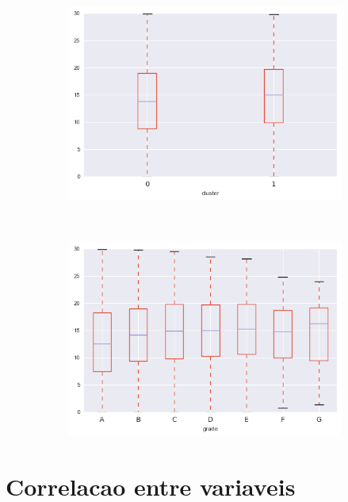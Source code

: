 \begin{anexosenv}
\begin{figure}[t!]
\begin{subfigure}[t]{0.5\textwidth}
            \centerline{\includegraphics[width=1.05\textwidth]{img/dti_by_cluster}}
        \end{subfigure}%
        ~ 
        \begin{subfigure}[t]{0.5\textwidth}
            \centering
   
            \centerline{\includegraphics[width=1.05\textwidth]{img/dti_by_grade}}

        \end{subfigure}
\end{figure}

\chapter{Correlacao entre variaveis}



\end{anexosenv}
